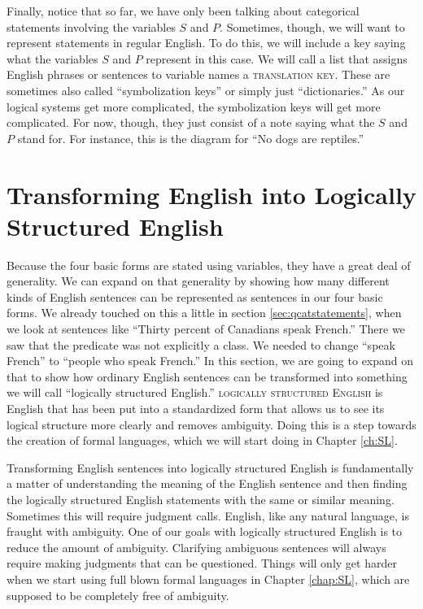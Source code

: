 Finally, notice that so far, we have only been talking about categorical statements involving the variables $S$ and $P$. Sometimes, though, we will want to represent statements in regular English. To do this, we will include a key saying what the variables $S$ and $P$ represent in this case. We will call a list that assigns English phrases or sentences to variable names a \textsc{\gls{translation key}}.\label{def:translation_key} These are sometimes also called ``symbolization keys'' or simply just ``dictionaries.'' As our logical systems get more complicated, the symbolization keys will get more complicated. For now, though, they just consist of a note saying what the $S$ and $P$ stand for. For instance, this is the diagram for ``No dogs are reptiles.''


\section{Transforming English into Logically Structured English} \label{sec:transformation}

Because the four basic forms are stated using variables, they have a great deal of generality. We can expand on that generality by showing how many different kinds of English sentences can be represented as sentences in our four basic forms. We already touched on this a little in section \ref{sec:qcatstatements}, when we look at sentences like ``Thirty percent of Canadians speak French.'' There we saw that the predicate was not explicitly a class. We needed to change ``speak French'' to ``people who speak French.'' In this section, we are going to expand on that to show how ordinary English sentences can be transformed into something we will call ``logically structured English.'' \textsc{\gls{logically structured English}} \label{def:LSE} is English that has been put into a standardized form that allows us to see its logical structure more clearly and removes ambiguity.  Doing this is a step towards the creation of formal languages, which we will start doing in Chapter \ref{ch:SL}.

Transforming English sentences into logically structured English is fundamentally a matter of understanding the meaning of the English sentence and then finding the logically structured English statements with the same or similar meaning. Sometimes this will require judgment calls. English, like any natural  language, is fraught with ambiguity. One of our goals with logically structured English is to reduce the amount of ambiguity. Clarifying ambiguous sentences will always require making judgments that can be questioned. Things will only get harder when we start using full blown formal languages in Chapter \ref{chap:SL}, which are supposed to be completely free of ambiguity.

